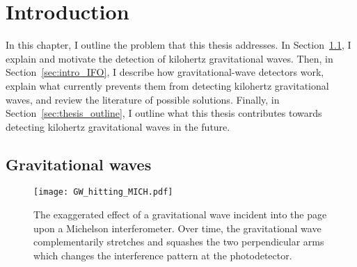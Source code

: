 \chapter{Introduction} %
\label{chp:introduction}





In this chapter, I outline the problem that this thesis addresses. In Section~\ref{sec:gravWaves}, I explain and motivate the detection of kilohertz gravitational waves. Then, in Section~\ref{sec:intro_IFO}, I describe how gravitational-wave detectors work, explain what currently prevents them from detecting kilohertz gravitational waves, and review the literature of possible solutions. Finally, in Section~\ref{sec:thesis_outline}, I outline what this thesis contributes towards detecting kilohertz gravitational waves in the future.


\section{Gravitational waves}
\label{sec:gravWaves}

\begin{figure}
	\centering
	\texttt{[image: GW\_hitting\_MICH.pdf]}
	\caption{The exaggerated effect of a gravitational wave incident into the page upon a Michelson interferometer. Over time, the gravitational wave complementarily stretches and squashes the two perpendicular arms which changes the interference pattern at the photodetector.}
	\label{fig:GW_incident_Michelson}
\end{figure}

